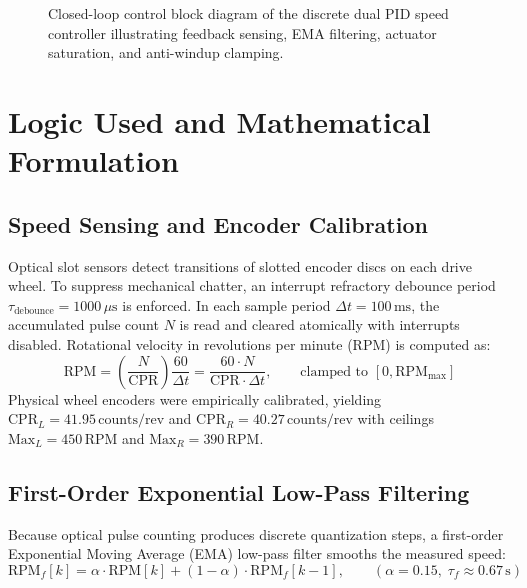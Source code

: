 \documentclass[11pt,a4paper]{article}
\begin{document}
\begin{figure}[H]
{%
}
\caption{Closed-loop control block diagram of the discrete dual PID speed controller illustrating feedback sensing, EMA filtering, actuator saturation, and anti-windup clamping.}
\label{fig_block_diagram}
\end{figure}

\newpage
\section{Logic Used and Mathematical Formulation}

\subsection{Speed Sensing and Encoder Calibration}
Optical slot sensors detect transitions of slotted encoder discs on each drive wheel. To suppress mechanical chatter, an interrupt refractory debounce period $\tau_{\text{debounce}} = 1000\,\mu\text{s}$ is enforced. In each sample period $\Delta t = 100\,\text{ms}$, the accumulated pulse count $N$ is read and cleared atomically with interrupts disabled. Rotational velocity in revolutions per minute (RPM) is computed as:
\begin{equation}
    \text{RPM} = \left(\frac{N}{\text{CPR}}\right) \frac{60}{\Delta t} = \frac{60 \cdot N}{\text{CPR} \cdot \Delta t}, \qquad \text{clamped to } [0, \text{RPM}_{\max}]
    \label{eq_rpm}
\end{equation}
Physical wheel encoders were empirically calibrated, yielding $\text{CPR}_L = 41.95\,\text{counts/rev}$ and $\text{CPR}_R = 40.27\,\text{counts/rev}$ with ceilings $\text{Max}_L = 450\,\text{RPM}$ and $\text{Max}_R = 390\,\text{RPM}$.

\subsection{First-Order Exponential Low-Pass Filtering}
Because optical pulse counting produces discrete quantization steps, a first-order Exponential Moving Average (EMA) low-pass filter smooths the measured speed:
\begin{equation}
    \text{RPM}_f[k] = \alpha \cdot \text{RPM}[k] + (1 - \alpha) \cdot \text{RPM}_f[k-1], \qquad (\alpha = 0.15, \; \tau_f \approx 0.67\,\text{s})
    \label{eq_filter}
\end{equation}
\end{document}
